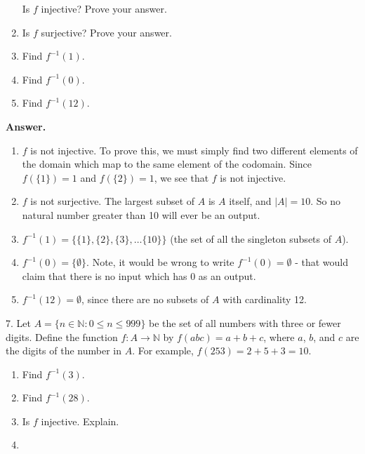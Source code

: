 \documentclass[10pt,]{book}
\theoremstyle{plain}
\theoremstyle{definition}
\theoremstyle{definition}
\theoremstyle{definition}
\numberwithin{equation}{section}
\def\N{\mathbb N}
\def\inv{^{-1}}
\def\st{:}
\begin{document}
\begin{exerciselist}
\begin{enumerate}[label=(\alph*)]
Is \(f\) injective?  Prove your answer.
%
\item\hypertarget{li-154}{}
Is \(f\) surjective?  Prove your answer.
%
\item\hypertarget{li-155}{}
Find \(f\inv(1)\).
%
\item\hypertarget{li-156}{}
Find \(f\inv(0)\).
%
\item\hypertarget{li-157}{}
Find \(f\inv(12)\).
%
\end{enumerate}
\par\smallskip
\par\smallskip
\noindent\textbf{Answer.}\hypertarget{answer-22}{}\quad
\leavevmode%
\begin{enumerate}[label=(\alph*)]
\item\hypertarget{li-158}{}\(f\) is not injective.  To prove this, we must simply find two different elements of the domain which map to the same element of the codomain.  Since \(f(\{1\}) = 1\) and \(f(\{2\}) = 1\), we see that \(f\) is not injective.\item\hypertarget{li-159}{}\(f\) is not surjective.  The largest subset of \(A\) is \(A\) itself, and \(|A| = 10\).  So no natural number greater than 10 will ever be an output.\item\hypertarget{li-160}{}\(f\inv(1) = \{\{1\}, \{2\}, \{3\}, \ldots \{10\}\}\) (the set of all the singleton subsets of \(A\)).\item\hypertarget{li-161}{}\(f\inv(0) = \{\emptyset\}\).  Note, it would be wrong to write \(f\inv(0) = \emptyset\) - that would claim that there is no input which has 0 as an output.\item\hypertarget{li-162}{}\(f\inv(12) = \emptyset\), since there are no subsets of \(A\) with cardinality 12.\end{enumerate}
\item[7.]\hypertarget{exercise-23}{}
Let \(A = \{n \in \N \st 0 \le n \le 999\}\) be the set of all numbers with three or fewer digits. Define the function \(f:A \to \N\) by \(f(abc) = a+b+c\), where \(a\), \(b\), and \(c\) are the digits of the number in \(A\). For example, \(f(253) = 2 + 5 + 3 =  10\).
%
\leavevmode%
\begin{enumerate}[label=(\alph*)]
\item\hypertarget{li-163}{}
Find \(f\inv(3)\).
%
\item\hypertarget{li-164}{}
Find \(f\inv(28)\).
%
\item\hypertarget{li-165}{}
Is \(f\) injective.  Explain.
%
\item\hypertarget{li-166}{}

\end{enumerate}
\end{exerciselist}
\end{document}
